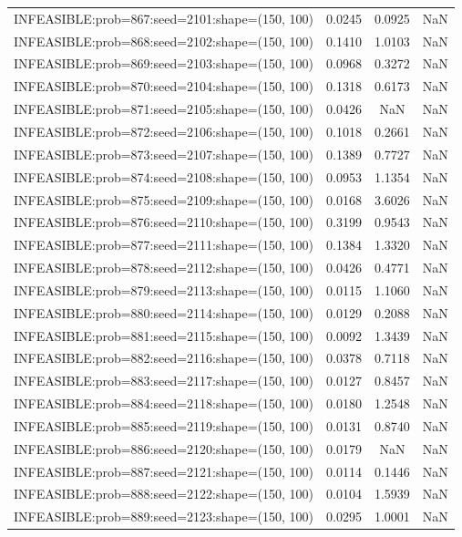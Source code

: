\begin{longtable}{lccc}
INFEASIBLE:prob=867:seed=2101:shape=(150, 100) & 0.0245 &  0.0925 &    NaN \\
INFEASIBLE:prob=868:seed=2102:shape=(150, 100) & 0.1410 &  1.0103 &    NaN \\
INFEASIBLE:prob=869:seed=2103:shape=(150, 100) & 0.0968 &  0.3272 &    NaN \\
INFEASIBLE:prob=870:seed=2104:shape=(150, 100) & 0.1318 &  0.6173 &    NaN \\
INFEASIBLE:prob=871:seed=2105:shape=(150, 100) & 0.0426 &     NaN &    NaN \\
INFEASIBLE:prob=872:seed=2106:shape=(150, 100) & 0.1018 &  0.2661 &    NaN \\
INFEASIBLE:prob=873:seed=2107:shape=(150, 100) & 0.1389 &  0.7727 &    NaN \\
INFEASIBLE:prob=874:seed=2108:shape=(150, 100) & 0.0953 &  1.1354 &    NaN \\
INFEASIBLE:prob=875:seed=2109:shape=(150, 100) & 0.0168 &  3.6026 &    NaN \\
INFEASIBLE:prob=876:seed=2110:shape=(150, 100) & 0.3199 &  0.9543 &    NaN \\
INFEASIBLE:prob=877:seed=2111:shape=(150, 100) & 0.1384 &  1.3320 &    NaN \\
INFEASIBLE:prob=878:seed=2112:shape=(150, 100) & 0.0426 &  0.4771 &    NaN \\
INFEASIBLE:prob=879:seed=2113:shape=(150, 100) & 0.0115 &  1.1060 &    NaN \\
INFEASIBLE:prob=880:seed=2114:shape=(150, 100) & 0.0129 &  0.2088 &    NaN \\
INFEASIBLE:prob=881:seed=2115:shape=(150, 100) & 0.0092 &  1.3439 &    NaN \\
INFEASIBLE:prob=882:seed=2116:shape=(150, 100) & 0.0378 &  0.7118 &    NaN \\
INFEASIBLE:prob=883:seed=2117:shape=(150, 100) & 0.0127 &  0.8457 &    NaN \\
INFEASIBLE:prob=884:seed=2118:shape=(150, 100) & 0.0180 &  1.2548 &    NaN \\
INFEASIBLE:prob=885:seed=2119:shape=(150, 100) & 0.0131 &  0.8740 &    NaN \\
INFEASIBLE:prob=886:seed=2120:shape=(150, 100) & 0.0179 &     NaN &    NaN \\
INFEASIBLE:prob=887:seed=2121:shape=(150, 100) & 0.0114 &  0.1446 &    NaN \\
INFEASIBLE:prob=888:seed=2122:shape=(150, 100) & 0.0104 &  1.5939 &    NaN \\
INFEASIBLE:prob=889:seed=2123:shape=(150, 100) & 0.0295 &  1.0001 &    NaN \\

\end{longtable}
